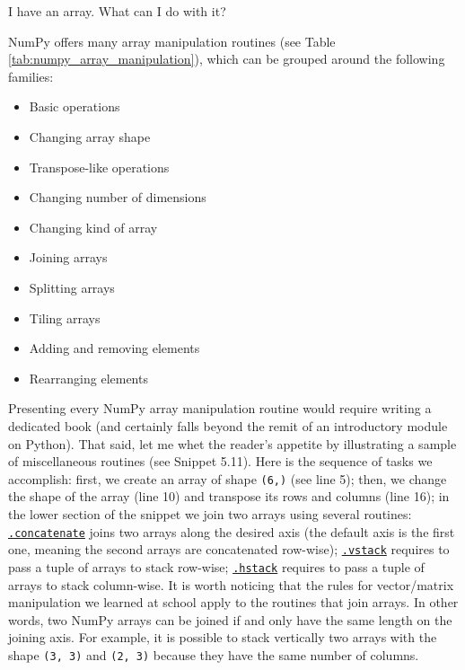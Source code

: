 \documentclass[a4paper,11pt]{book}
\newcommand{\question}[1]{%
    \begin{tcolorbox}[colback=comp_c!10,colframe=comp_c,sidebyside align=top,width=\linewidth,before skip=1ex]
        #1
    \end{tcolorbox}
    \switchcolumn%
}
\newcommand{\note}[1]{%
    \begin{tcolorbox}[colback=white!0,colframe=white!10,width=\linewidth,before skip=1ex]
        #1
    \end{tcolorbox}
}
\begin{document}
\begin{paracol}{2}
	\question{\raggedright I have an array. What can I do with it?}
	\note{NumPy offers many array manipulation routines (see Table \ref{tab:numpy_array_manipulation}), which can be grouped around the following families:
	
	\begin{itemize}
		\item Basic operations
		\item Changing array shape 
		\item Transpose-like operations
		\item Changing number of dimensions 
		\item Changing kind of array
		\item Joining arrays 
		\item Splitting arrays 
		\item Tiling arrays 
		\item Adding and removing elements 
		\item Rearranging elements
	\end{itemize}
	
        \quad Presenting every NumPy array manipulation routine would require writing a dedicated book (and certainly falls beyond the remit of an introductory module on Python). That said, let me whet the reader's appetite by illustrating a sample of miscellaneous routines (see Snippet 5.11). Here is the sequence of tasks we accomplish: first, we create an array of shape \texttt{(6,)} (see line 5); then, we change the shape of the array (line 10) and transpose its rows and columns (line 16); in the lower section of the snippet we join two arrays using several routines: \href{https://numpy.org/doc/stable/reference/generated/numpy.concatenate.html\#numpy.concatenate}{\texttt{.concatenate}} joins two arrays along the desired axis (the default axis is the first one, meaning the second arrays are concatenated row-wise); \href{https://numpy.org/doc/stable/reference/generated/numpy.vstack.html\#numpy.vstack}{\texttt{.vstack}} requires to pass a tuple of arrays to stack row-wise; \href{https://numpy.org/doc/stable/reference/generated/numpy.hstack.html\#numpy.hstack}{\texttt{.hstack}} requires to pass a tuple of arrays to stack column-wise. It is worth noticing that the rules for vector/matrix manipulation we learned at school apply to the routines that join arrays. In other words, two NumPy arrays can be joined if and only have the same length on the joining axis. For example, it is possible to stack vertically two arrays with the shape \texttt{(3, 3)} and \texttt{(2, 3)} because they have the same number of columns.}
\end{paracol}
\clearpage
\end{document}
